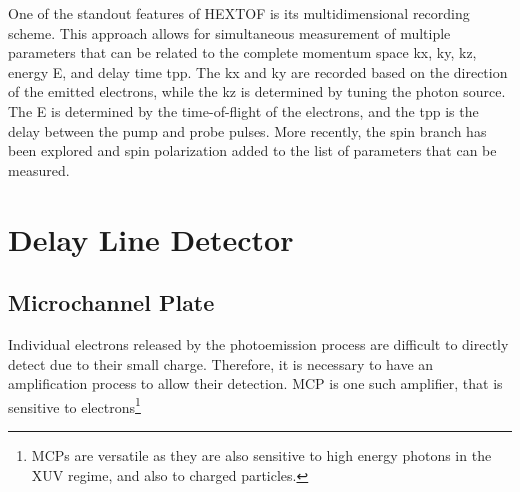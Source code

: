 One of the standout features of \gls{HEXTOF} is its multidimensional recording scheme. This approach allows for simultaneous measurement of multiple parameters that can be related to the complete momentum space \gls{kx}, \gls{ky}, \gls{kz}, energy \gls{E}, and delay time \gls{tpp}. The \gls{kx} and \gls{ky} are recorded based on the direction of the emitted electrons, while the \gls{kz} is determined by tuning the photon source. The \gls{E} is determined by the time-of-flight of the electrons, and the \gls{tpp} is the delay between the pump and probe pulses. More recently, the spin branch has been explored and spin polarization added to the list of parameters that can be measured. 

\section{Delay Line Detector}\label{section:dld}
\subsection*{Microchannel Plate}
Individual electrons released by the photoemission process are difficult to directly detect due to their small charge.  Therefore, it is necessary to have an amplification process to allow their detection. \Gls{MCP} is one such amplifier, that is sensitive to electrons\footnote{\Glspl{MCP} are versatile as they are also sensitive to high energy photons in the \gls{XUV} regime, and also to charged particles.}

